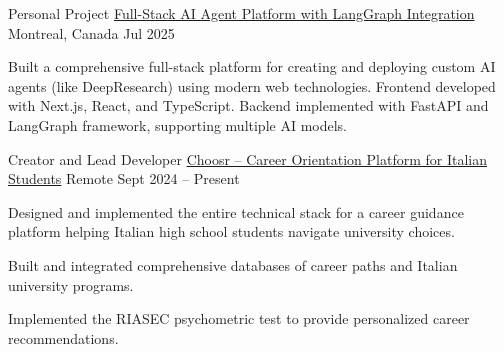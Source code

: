 
\newcommand\gitscale{0.015}
\newcommand\bpscale{0.028}

\begin{cventries}


\cventry
  {Personal Project} %
  {\href{https://github.com/Dundalia/agent-studio}{Full-Stack AI Agent Platform with LangGraph Integration}} 
  {Montreal, Canada} %
  {Jul 2025} %
  {
    \begin{cvitems} %
      \item {Built a comprehensive full-stack platform for creating and deploying custom AI agents (like DeepResearch) using modern web technologies. Frontend developed with Next.js, React, and TypeScript. Backend implemented with FastAPI and LangGraph framework, supporting multiple AI models.}
    \end{cvitems}
  }
\cventry
  {Creator and Lead Developer} %
  {\href{https://choosr.it/esplora-carriere}{Choosr -- Career Orientation Platform for Italian Students}} 
  {Remote} %
  {Sept 2024 -- Present} %
  {
    \begin{cvitems} %
      \item {Designed and implemented the entire technical stack for a career guidance platform helping Italian high school students navigate university choices. }
      \item {Built and integrated comprehensive databases of career paths and Italian university programs.}
      \item {Implemented the RIASEC psychometric test to provide personalized career recommendations.}
    \end{cvitems}
  }



\end{cventries}
